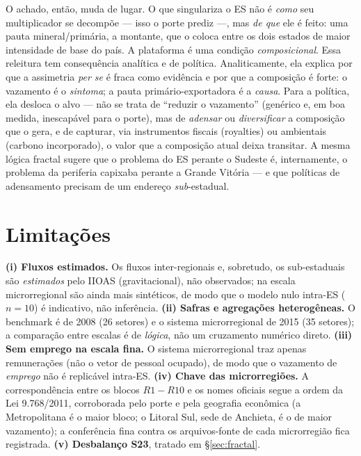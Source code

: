 \documentclass[11pt,a4paper]{article}
\begin{document}
O achado, então, muda de lugar. O que singulariza o ES não é \emph{como} seu
multiplicador se decompõe --- isso o porte prediz ---, mas \emph{de que} ele é
feito: uma pauta mineral/primária, a montante, que o coloca entre os dois estados
de maior intensidade de base do país. A plataforma é uma condição
\emph{composicional}. Essa releitura tem consequência analítica e de política.
Analiticamente, ela explica por que a assimetria \emph{per se} é fraca como
evidência e por que a composição é forte: o vazamento é o \emph{sintoma}; a
pauta primário-exportadora é a \emph{causa}. Para a política, ela desloca o alvo
--- não se trata de ``reduzir o vazamento'' (genérico e, em boa medida,
inescapável para o porte), mas de \emph{adensar} ou \emph{diversificar} a
composição que o gera, e de capturar, via instrumentos fiscais (royalties) ou
ambientais (carbono incorporado), o valor que a composição atual deixa transitar.
A mesma lógica fractal sugere que o problema do ES perante o Sudeste é,
internamente, o problema da periferia capixaba perante a Grande Vitória --- e que
políticas de adensamento precisam de um endereço \emph{sub}-estadual.

\section{Limitações}
\label{sec:limites}
\textbf{(i) Fluxos estimados.} Os fluxos inter-regionais e, sobretudo, os
sub-estaduais são \emph{estimados} pelo IIOAS (gravitacional), não observados;
na escala microrregional são ainda mais sintéticos, de modo que o modelo nulo
intra-ES ($n=10$) é indicativo, não inferência. \textbf{(ii) Safras e agregações
heterogêneas.} O benchmark é de 2008 (26 setores) e o sistema microrregional de
2015 (35 setores); a comparação entre escalas é de \emph{lógica}, não um
cruzamento numérico direto. \textbf{(iii) Sem emprego na escala fina.} O sistema
microrregional traz apenas remunerações (não o vetor de pessoal ocupado), de modo
que o vazamento de \emph{emprego} não é replicável intra-ES. \textbf{(iv) Chave
das microrregiões.} A correspondência entre os blocos $R1\!-\!R10$ e os nomes
oficiais segue a ordem da Lei 9.768/2011, corroborada pelo porte e pela geografia
econômica (a Metropolitana é o maior bloco; o Litoral Sul, sede de Anchieta, é o
de maior vazamento); a conferência fina contra os arquivos-fonte de cada
microrregião fica registrada. \textbf{(v) Desbalanço S23}, tratado em
\S\ref{sec:fractal}.
\end{document}
